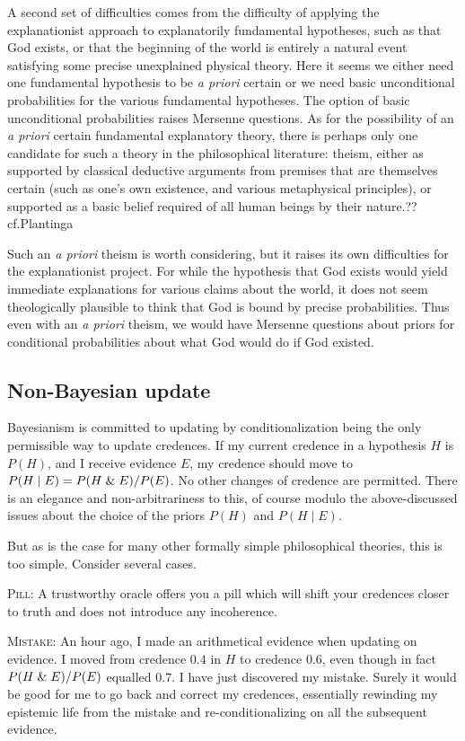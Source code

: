 A second set of difficulties comes from the difficulty of applying the explanationist approach to explanatorily 
fundamental hypotheses, such as that God exists, or that the beginning of the world is entirely a natural event 
satisfying some precise unexplained physical theory. Here it seems we either need one fundamental hypothesis to be 
\textit{a priori} certain or we need basic unconditional probabilities for the various fundamental hypotheses. 
The option of basic unconditional probabilities raises Mersenne questions. As for the possibility of 
an \textit{a priori} certain fundamental explanatory theory, there is perhaps only one candidate for such a 
theory in the philosophical literature: theism, either as supported by classical deductive arguments from
premises that are themselves certain (such as one's own existence, and various metaphysical principles), or 
supported as a basic belief required of all human beings by their nature.??cf.Plantinga 

Such an \textit{a 
priori} theism is worth considering, but it raises its own difficulties for the explanationist project. For 
while the hypothesis that God exists would yield immediate explanations for various claims about the world,
it does not seem theologically plausible to think that God is bound by precise probabilities. Thus even with 
an \textit{a priori} theism, we would have Mersenne questions about priors for conditional probabilities about
what God would do if God existed.

\subsection{Non-Bayesian update}
Bayesianism is committed to updating by conditionalization being the only permissible way to update credences. 
If my current credence in a hypothesis $H$ is $P(H)$, and I receive evidence $E$, my credence should move 
to $P(H\mid E)=P(H\mathrel{\&} E)/P(E)$. No other changes of credence are permitted. There is an elegance and non-arbitrariness to this,
of course modulo the above-discussed issues about the choice of the priors $P(H)$ and $P(H\mid E)$.

But as is the case for many other formally simple philosophical theories, this is too
simple. Consider several cases. 

\textsc{Pill:} A trustworthy oracle offers you a pill which will shift your credences closer to truth and does not introduce 
any incoherence. 

\textsc{Mistake:} An hour ago, I made an arithmetical evidence when updating on evidence. I moved from credence $0.4$ in $H$ to
credence $0.6$, even though in fact $P(H\mathrel{\&} E)/P(E)$ equalled $0.7$. I have just discovered my mistake. Surely it would be good
for me to go back and correct my credences, essentially rewinding my epistemic life from the mistake and re-conditionalizing on all
the subsequent evidence. 

